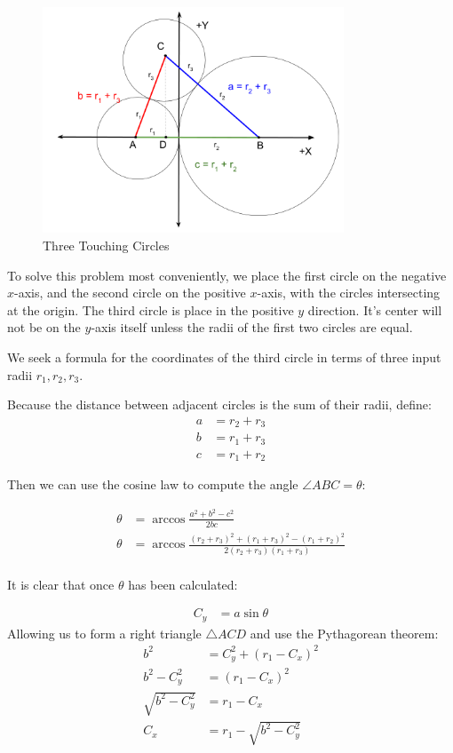 \documentclass{article}
\begin{document}
\begin{figure}
     \centering
     \includegraphics[width=0.80\textwidth]{figures/ThreeTouchingCircles.png}
     \caption{Three Touching Circles}
  \label{fig:Tangent}
\end{figure}

To solve this problem most conveniently, we place the first circle on the negative $x$-axis, and the second circle
on the positive $x$-axis, with the circles intersecting at the origin.
The third circle is place in the positive $y$ direction. It's center will not be on the $y$-axis itself unless the
radii of the first two circles are equal.

We seek a formula for the coordinates of the third circle in terms of three input radii $r_1,r_2,r_3$.

Because the distance between adjacent circles is the sum of their radii, define:
\begin{align}
a  &= r_2 + r_3 \\
b  &= r_1 + r_3 \\
c  &= r_1 + r_2
\end{align}

Then we can use the cosine law to compute the angle $\angle ABC = \theta$:


\begin{align}
  \theta  &= \arccos{\frac{a^2 + b^2 - c^2}{2bc}} \\
  \theta  &= \arccos{\frac{(r_2+r_3)^2 + (r_1+r_3)^2 - (r_1+r_2)^2}{2(r_2+r_3)(r_1+r_3)}} \\
\end{align}

It is clear that once $\theta$ has been calculated:

\begin{align}
 C_y  &= a\sin{\theta}
\end{align}
Allowing us to form a right triangle $\triangle ACD$ and use the Pythagorean theorem:
\begin{align}
  b^2  &= C_y^2 + (r_1-C_x)^2 \\
  b^2 - C_y^2  &= (r_1-C_x)^2  \\
  \sqrt{b^2 - C_y^2}  &= r_1-C_x  \\
  C_x &= r_1 -  \sqrt{b^2 - C_y^2}
\end{align}
\end{document}
